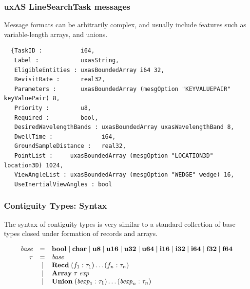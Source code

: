 \documentclass{beamer}
\newcommand{\konst}[1]{\ensuremath{\mbox{\bf{#1}}}}
\begin{document}
\begin{frame}[fragile]\frametitle{uxAS LineSearchTask messages}

  Message formats can be arbitrarily complex, and usually include
  features such as variable-length arrays, and unions.

  {\small
\begin{verbatim}
  {TaskID :           i64,
   Label :            uxasString,
   EligibleEntities : uxasBoundedArray i64 32,
   RevisitRate :      real32,
   Parameters :       uxasBoundedArray (mesgOption "KEYVALUEPAIR" keyValuePair) 8,
   Priority :         u8,
   Required :         bool,
   DesiredWavelengthBands : uxasBoundedArray uxasWavelengthBand 8,
   DwellTime :              i64,
   GroundSampleDistance :   real32,
   PointList :     uxasBoundedArray (mesgOption "LOCATION3D" location3D) 1024,
   ViewAngleList : uxasBoundedArray (mesgOption "WEDGE" wedge) 16,
   UseInertialViewAngles : bool
\end{verbatim}
}
\end{frame}

\begin{frame}[fragile]\frametitle{Contiguity Types: Syntax}

The syntax of contiguity types is very similar to a standard
collection of base types closed under formation of records and arrays.

\[
\begin{array}{rcl}
 \mathit{base} & = & \konst{bool} \mid \konst{char} \mid \konst{u8} \mid
 \konst{u16} \mid \konst{u32} \mid \konst{u64}  \mid \konst{i16} \mid
 \konst{i32} \mid \konst{i64} \mid \konst{f32} \mid \konst{f64} \\
 \tau & = & \mathit{base} \\
      & \mid & \konst{Recd}\; (f_1 : \tau_1) \ldots (f_n : \tau_n) \\
      & \mid & \konst{Array}\; \tau \; \mathit{exp} \\
      & \mid & \konst{Union}\; (\mathit{bexp}_1 : \tau_1) \ldots (\mathit{bexp}_n : \tau_n)
\end{array}
\]
\end{frame}
\end{document}
